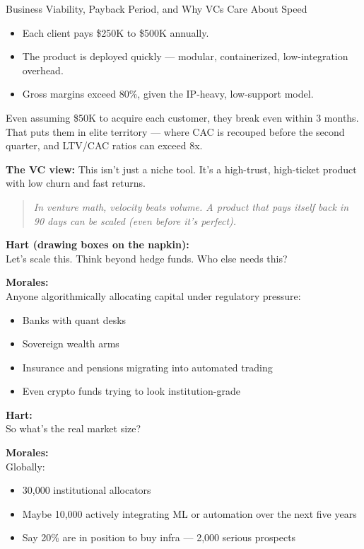 \begin{TechnicalSidebar}{Business Viability, Payback Period, and Why VCs Care About Speed}
  \medskip
  
  \begin{itemize}
    \item Each client pays \$250K to \$500K annually.
    \item The product is deployed quickly — modular, containerized, low-integration overhead.
    \item Gross margins exceed 80\%, given the IP-heavy, low-support model.
  \end{itemize}
  
  \medskip
  
  Even assuming \$50K to acquire each customer, they break even within 3 months.  
  That puts them in elite territory — where CAC is recouped before the second quarter, and LTV/CAC ratios can exceed 8x.
  
  \medskip
  
  \textbf{The VC view:}  
  This isn’t just a niche tool. It’s a high-trust, high-ticket product with low churn and fast returns.
  
  \begin{quote}
  \textit{In venture math, velocity beats volume.  
  A product that pays itself back in 90 days can be scaled   
  (even before it's perfect).}
  \end{quote}
  
\end{TechnicalSidebar}
  

\medskip


\textbf{Hart (drawing boxes on the napkin):} \\
Let’s scale this. Think beyond hedge funds. Who else needs this?

\textbf{Morales:} \\
Anyone algorithmically allocating capital under regulatory pressure:
\begin{itemize}
  \item Banks with quant desks  
  \item Sovereign wealth arms  
  \item Insurance and pensions migrating into automated trading  
  \item Even crypto funds trying to look institution-grade  
\end{itemize}

\textbf{Hart:} \\
So what’s the real market size?

\textbf{Morales:} \\
Globally:
\begin{itemize}
  \item 30,000 institutional allocators  
  \item Maybe 10,000 actively integrating ML or automation over the next five years  
  \item Say 20\% are in position to buy infra — 2,000 serious prospects
\end{itemize}

